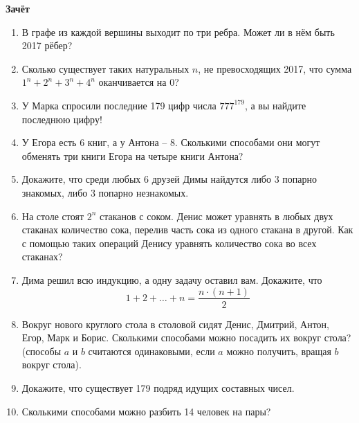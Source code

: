 \centerline{\Large \bf Зачёт}
\begin{enumerate}
\item В графе из каждой вершины выходит по три ребра. Может ли в нём быть 2017 рёбер?
\item Сколько существует таких натуральных $n$, не превосходящих 2017, что сумма $1^n + 2^n + 3^n + 4^n$
оканчивается на 0?
\item У Марка спросили последние 179 цифр числа $777^{179}$, а вы найдите последнюю цифру!
\item У Егора есть 6 книг, а у Антона – 8. Сколькими способами они могут обменять три книги
Егора на четыре книги Антона?
\item Докажите, что среди любых 6 друзей Димы найдутся либо 3 попарно знакомых, либо 3 попарно
незнакомых.
\item На столе стоят $2^n$ стаканов с соком. Денис может уравнять в любых двух стаканах количество
сока, перелив часть сока из одного стакана в другой. Как с помощью таких операций Денису уравнять
количество сока во всех стаканах?
\item Дима решил всю индукцию, а одну задачу оставил вам. Докажите, что
\[ 1 + 2 + \ldots + n = \frac{n \cdot (n+1)}{2}\]
\item Вокруг нового круглого стола в столовой сидят Денис, Дмитрий, Антон, Егор, Марк и Борис.
Сколькими способами можно посадить их вокруг стола? (способы $a$ и $b$ считаются одинаковыми, если $a$
можно получить, вращая $b$ вокруг стола).
\item Докажите, что существует 179 подряд идущих составных чисел.
\item Сколькими способами можно разбить 14 человек на пары?
\end{enumerate}
